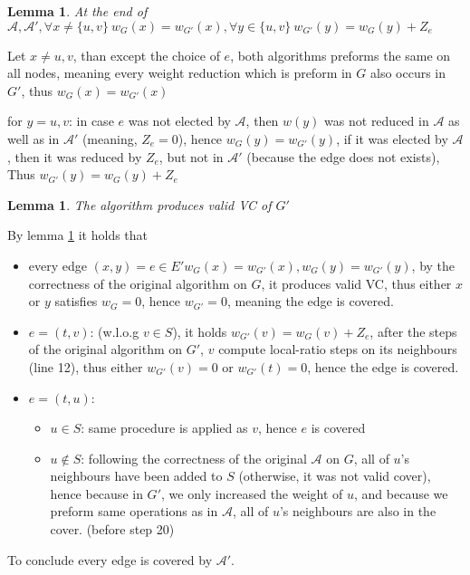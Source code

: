 \documentclass[11pt]{article}
\newtheorem{lemma}[theorem]{Lemma}
\begin{document}
\begin{lemma}
\label{lemma_5}
At the end of $\mathcal{A, A'}, \forall x \ne \{u,v\} \: w_G(x)=w_{G'}(x), \forall y\in\{u,v\} \: w_{G'}(y)=w_G(y) + Z_e$
\end{lemma}
Let $x\ne u,v$, than except the choice of $e$, both algorithms preforms the same on all nodes, meaning every weight reduction which is preform in $G$ also occurs in $G'$, thus $ w_G(x)=w_{G'}(x)$

for $y=u,v$: in case $e$ was not elected by $\mathcal{A}$, then $w(y)$ was not reduced in $\mathcal{A}$ as well as in $\mathcal{A'}$ (meaning, $Z_e = 0$), hence $ w_G(y)=w_{G'}(y)$, if it was elected by $\mathcal{A}$, then it was reduced by $Z_e$, but not in $\mathcal{A'}$ (because the edge does not exists), Thus $w_{G'}(y)=w_G(y) + Z_e$


\begin{lemma}
\label{A_TAG_VALID_VC}
The algorithm produces valid VC of $G'$
\end{lemma}
By lemma \ref{lemma_5} it holds that
\begin{itemize}
    \item every edge $(x,y) = e\in E' w_G(x)=w_{G'}(x), w_G(y)=w_{G'}(y)$, by the correctness of the original algorithm on $G$, it produces valid VC, thus either $x$ or $y$ satisfies $w_G=0$, hence $w_{G'} = 0$, meaning the edge is covered. 
    \item $e= (t,v)$: (w.l.o.g $v \in S$), it holds  $w_{G'}(v)=w_G(v) + Z_e$, after the steps of the original algorithm on $G'$, $v$ compute local-ratio steps on its neighbours (line 12), thus either $w_{G'}(v)=0$ or $w_{G'}(t) = 0$, hence the edge is covered.
    \item $e = (t,u)$:
        \begin{itemize}
            \item $u \in S$: same procedure is applied as $v$, hence $e$ is covered
            \item $u \notin S$: following the correctness of the original $\mathcal{A}$ on $G$, all of $u$'s neighbours have been added to $S$ (otherwise, it was not valid cover), hence because in $G'$, we only increased the weight of $u$, and because we preform same operations as in $\mathcal{A}$, all of $u$'s neighbours are also in the cover. (before step 20)
        \end{itemize}
\end{itemize}
To conclude every edge is covered by $\mathcal{A'}$.
\end{document}
